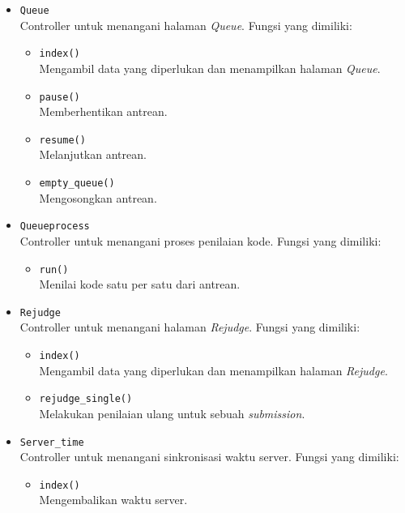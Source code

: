 \begin{itemize}
	\item \verb|Queue| \\ Controller untuk menangani halaman \textit{Queue}. Fungsi yang dimiliki:
	\begin{itemize}
        \item \verb|index()| \\ Mengambil data yang diperlukan dan menampilkan halaman \textit{Queue}.
        \item \verb|pause()| \\ Memberhentikan antrean.
        \item \verb|resume()| \\ Melanjutkan antrean.
        \item \verb|empty_queue()| \\ Mengosongkan antrean.
	\end{itemize}
	
	\item \verb|Queueprocess| \\Controller untuk menangani proses penilaian kode. Fungsi yang dimiliki:
	\begin{itemize}
        \item \verb|run()| \\ Menilai kode satu per satu dari antrean.
	\end{itemize}
	
	\item \verb|Rejudge| \\ Controller untuk menangani halaman \textit{Rejudge}. Fungsi yang dimiliki:
	\begin{itemize}
        \item \verb|index()| \\ Mengambil data yang diperlukan dan menampilkan halaman \textit{Rejudge}.
        \item \verb|rejudge_single()| \\ Melakukan penilaian ulang untuk sebuah \textit{submission}.
	\end{itemize}
	
	\item \verb|Server_time| \\ Controller untuk menangani sinkronisasi waktu server. Fungsi yang dimiliki:
	\begin{itemize}
        \item \verb|index()| \\ Mengembalikan waktu server.
	\end{itemize}
	

\end{itemize}
